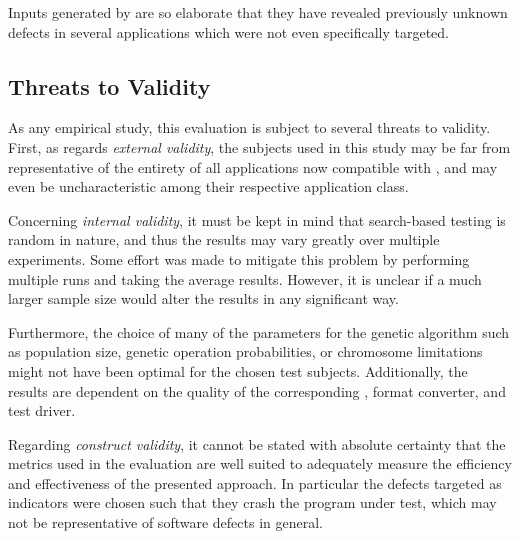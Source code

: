 \begin{mdframed}
Inputs generated by \xmlmate are so elaborate that they have revealed previously unknown defects in several
applications which were not even specifically targeted.
\end{mdframed}

\subsection{Threats to Validity}
As any empirical study, this evaluation is subject to several threats to validity.
First, as regards \emph{external validity}, the subjects used in this study may be far from representative of
the entirety of all applications now compatible with \xmlmate, and may even be uncharacteristic among their
respective application class.

Concerning \emph{internal validity}, it must be kept in mind that search-based testing is random in nature, and
thus the results may vary greatly over multiple experiments. Some effort was made to mitigate this problem by
performing multiple runs and taking the average results. However, it is unclear if a much larger sample size
would alter the results in any significant way.

Furthermore, the choice of many of the parameters for the genetic algorithm such as population size,
genetic operation probabilities, or chromosome limitations might not have been optimal for the chosen test
subjects. Additionally, the results are dependent on the quality of the corresponding \xsd, format converter,
and test driver.

Regarding \emph{construct validity}, it cannot be stated with absolute certainty that the metrics used in the
evaluation are well suited to adequately measure the efficiency and effectiveness of the presented approach.
In particular the defects targeted as indicators were chosen such that they crash the program under
test, which may not be representative of software defects in general. 
